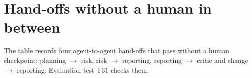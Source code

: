 \section{Hand-offs without a human in between}

The  table records four agent-to-agent hand-offs that pass without a human checkpoint: planning $\rightarrow$ risk, risk $\rightarrow$ reporting, reporting $\rightarrow$ critic and change $\rightarrow$ reporting. Evaluation test T31 checks them.

